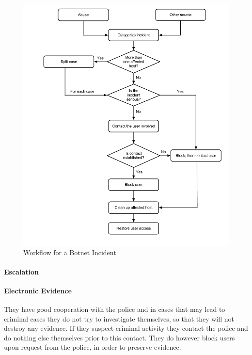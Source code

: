 \begin{figure}[H]
\hspace{-1.1cm}\includegraphics[scale=0.53]{WorkflowCaseABotnet.png}
\caption[Workflow for a Botnet Incident, Case B]{Workflow for a Botnet Incident}
\label{fig:WorkflowCaseABotnet}
\end{figure}

\paragraph{Escalation}

\paragraph{Electronic Evidence}
They have good cooperation with the police and in cases that may lead to criminal cases they do not try to investigate themselves, so that they will not destroy any evidence. If they suspect criminal activity they contact the police and do nothing else themselves prior to this contact. They do however block users upon request from the police, in order to preserve evidence.

